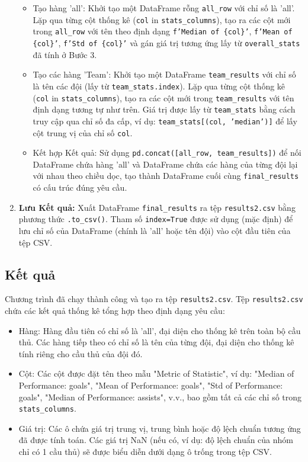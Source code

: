 \documentclass[12pt, a4paper]{report}
\begin{document}
\begin{enumerate}[label=\textbf{Bước \arabic*:}, leftmargin=*]
\begin{itemize}[leftmargin=0em]
        \item Tạo hàng 'all': Khởi tạo một DataFrame rỗng \texttt{all\_row} với chỉ số là 'all'. Lặp qua từng cột thống kê (\texttt{col} in \texttt{stats\_columns}), tạo ra các cột mới trong \texttt{all\_row} với tên theo định dạng \texttt{f'Median of \{col\}'}, \texttt{f'Mean of \{col\}'}, \texttt{f'Std of \{col\}'} và gán giá trị tương ứng lấy từ \texttt{overall\_stats} đã tính ở Bước 3.
        \item Tạo các hàng 'Team': Khởi tạo một DataFrame \texttt{team\_results} với chỉ số là tên các đội (lấy từ \texttt{team\_stats.index}). Lặp qua từng cột thống kê (\texttt{col} in \texttt{stats\_columns}), tạo ra các cột mới trong \texttt{team\_results} với tên định dạng tương tự như trên. Giá trị được lấy từ \texttt{team\_stats} bằng cách truy cập qua chỉ số đa cấp, ví dụ: \texttt{team\_stats[(col, 'median')]} để lấy cột trung vị của chỉ số \texttt{col}.
        \item Kết hợp Kết quả: Sử dụng \texttt{pd.concat([all\_row, team\_results])} để nối DataFrame chứa hàng 'all' và DataFrame chứa các hàng của từng đội lại với nhau theo chiều dọc, tạo thành DataFrame cuối cùng \texttt{final\_results} có cấu trúc đúng yêu cầu.
    \end{itemize}
    \item \textbf{Lưu Kết quả:}
    Xuất DataFrame \texttt{final\_results} ra tệp \texttt{results2.csv} bằng phương thức \texttt{.to\_csv()}.
    Tham số \texttt{index=True} được sử dụng (mặc định) để lưu chỉ số của DataFrame (chính là 'all' hoặc tên đội) vào cột đầu tiên của tệp CSV.
\end{enumerate}

\subsection{Kết quả}
Chương trình đã chạy thành công và tạo ra tệp \texttt{results2.csv}.
Tệp \texttt{results2.csv} chứa các kết quả thống kê tổng hợp theo định dạng yêu cầu:
\begin{itemize}
    \item Hàng: Hàng đầu tiên có chỉ số là 'all', đại diện cho thống kê trên toàn bộ cầu thủ. Các hàng tiếp theo có chỉ số là tên của từng đội, đại diện cho thống kê tính riêng cho cầu thủ của đội đó.
    \item Cột: Các cột được đặt tên theo mẫu "Metric of Statistic", ví dụ: "Median of Performance: goals", "Mean of Performance: goals", "Std of Performance: goals", "Median of Performance: assists", v.v., bao gồm tất cả các chỉ số trong \texttt{stats\_columns}.
    \item Giá trị: Các ô chứa giá trị trung vị, trung bình hoặc độ lệch chuẩn tương ứng đã được tính toán. Các giá trị NaN (nếu có, ví dụ: độ lệch chuẩn của nhóm chỉ có 1 cầu thủ) sẽ được biểu diễn dưới dạng ô trống trong tệp CSV.
\end{itemize}
\end{document}

